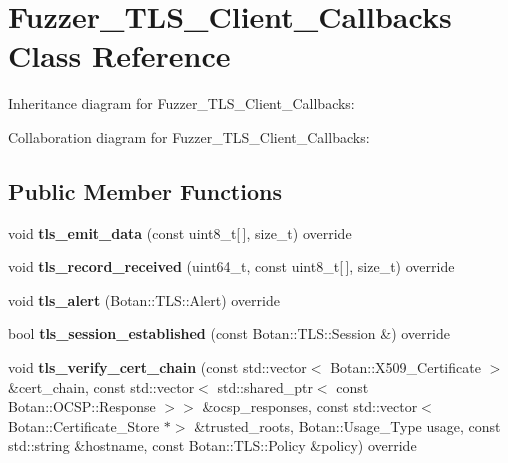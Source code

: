 \hypertarget{class_fuzzer___t_l_s___client___callbacks}{}\section{Fuzzer\+\_\+\+T\+L\+S\+\_\+\+Client\+\_\+\+Callbacks Class Reference}
\label{class_fuzzer___t_l_s___client___callbacks}


Inheritance diagram for Fuzzer\+\_\+\+T\+L\+S\+\_\+\+Client\+\_\+\+Callbacks\+:


Collaboration diagram for Fuzzer\+\_\+\+T\+L\+S\+\_\+\+Client\+\_\+\+Callbacks\+:
\subsection*{Public Member Functions}
\begin{DoxyCompactItemize}
\item 
\mbox{\label{class_fuzzer___t_l_s___client___callbacks_a848c28289620073f278287a5e1e58e9d}} 
void {\bfseries tls\+\_\+emit\+\_\+data} (const uint8\+\_\+t\mbox{[}$\,$\mbox{]}, size\+\_\+t) override
\item 
\mbox{\label{class_fuzzer___t_l_s___client___callbacks_aaaa0475ef39e5e421a2172325fadc3fc}} 
void {\bfseries tls\+\_\+record\+\_\+received} (uint64\+\_\+t, const uint8\+\_\+t\mbox{[}$\,$\mbox{]}, size\+\_\+t) override
\item 
\mbox{\label{class_fuzzer___t_l_s___client___callbacks_aba8adde204eaf93f916af40149ef630f}} 
void {\bfseries tls\+\_\+alert} (Botan\+::\+T\+L\+S\+::\+Alert) override
\item 
\mbox{\label{class_fuzzer___t_l_s___client___callbacks_a15e5581101d5eeca3633928edc40bb03}} 
bool {\bfseries tls\+\_\+session\+\_\+established} (const Botan\+::\+T\+L\+S\+::\+Session \&) override
\item 
\mbox{\label{class_fuzzer___t_l_s___client___callbacks_a3979b809782d35e416414a926435df41}} 
void {\bfseries tls\+\_\+verify\+\_\+cert\+\_\+chain} (const std\+::vector$<$ Botan\+::\+X509\+\_\+\+Certificate $>$ \&cert\+\_\+chain, const std\+::vector$<$ std\+::shared\+\_\+ptr$<$ const Botan\+::\+O\+C\+S\+P\+::\+Response $>$$>$ \&ocsp\+\_\+responses, const std\+::vector$<$ Botan\+::\+Certificate\+\_\+\+Store $\ast$$>$ \&trusted\+\_\+roots, Botan\+::\+Usage\+\_\+\+Type usage, const std\+::string \&hostname, const Botan\+::\+T\+L\+S\+::\+Policy \&policy) override
\end{DoxyCompactItemize}


